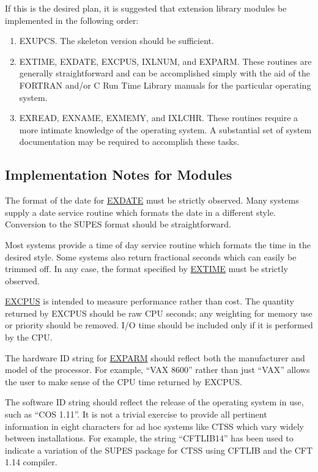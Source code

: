 If this is the desired plan,
it is suggested that extension library modules be implemented in the
following order:
\begin{enumerate}
\item EXUPCS.  The skeleton version should be sufficient.

\item EXTIME, EXDATE, EXCPUS, IXLNUM, and EXPARM.  These routines are
        generally straightforward and can be accomplished simply with the
        aid of the FORTRAN and/or C Run Time Library manuals for the
        particular operating system.

\item EXREAD, EXNAME, EXMEMY, and IXLCHR.  These routines require a more intimate
        knowledge of the operating system.  A substantial set of system
        documentation may be required to accomplish these tasks.
\end{enumerate}

\subsection{Implementation Notes for Modules}
The format of the date for \underline{EXDATE} must be strictly observed.
Many systems supply a date service routine which formats the date in a
different style. Conversion to the SUPES format should be straightforward. 

Most systems provide a time of day service routine which formats the time in
the desired style.  Some systems also return fractional seconds which can
easily be trimmed off.  In any case, the format specified by
\underline{EXTIME} must be strictly observed. 

\underline{EXCPUS} is intended to measure performance rather than cost.  The
quantity returned by EXCPUS should be raw CPU seconds; any weighting for
memory use or priority should be removed.  I/O time should be included only
if it is performed by the CPU. 

The hardware ID string for \underline{EXPARM} should reflect both the
manufacturer and model of the processor.  For example, ``VAX 8600'' rather
than just ``VAX'' allows the user to make sense of the CPU time returned by
EXCPUS. 

The software ID string should reflect the release of the operating system in
use, such as ``COS 1.11''.  It is not a trivial exercise to provide all
pertinent information in eight characters for ad hoc systems like CTSS which
vary widely between installations.  For example, the string ``CFTLIB14'' has
been used to indicate a variation of the SUPES package for CTSS using CFTLIB
and the CFT 1.14 compiler. 

